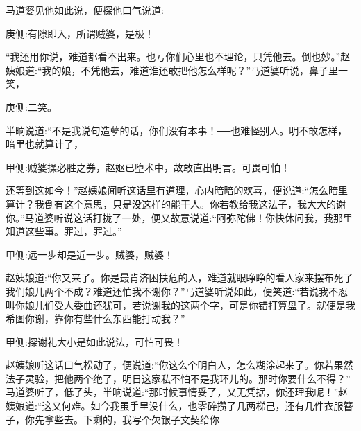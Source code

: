 \begin{parag}
    马道婆见他如此说，便探他口气说道:\begin{note}庚侧:有隙即入，所谓贼婆，是极！\end{note}“我还用你说，难道都看不出来。也亏你们心里也不理论，只凭他去。倒也妙。”赵姨娘道:“我的娘，不凭他去，难道谁还敢把他怎么样呢？”马道婆听说，鼻子里一笑，\begin{note}庚侧:二笑。\end{note}半晌说道:“不是我说句造孽的话，你们没有本事！──也难怪别人。明不敢怎样，暗里也就算计了，\begin{note}甲侧:贼婆操必胜之券，赵妪已堕术中，故敢直出明言。可畏可怕！\end{note}还等到这如今！”赵姨娘闻听这话里有道理，心内暗暗的欢喜，便说道:“怎么暗里算计？我倒有这个意思，只是没这样的能干人。你若教给我这法子，我大大的谢你。”马道婆听说这话打拢了一处，便又故意说道:“阿弥陀佛！你快休问我，我那里知道这些事。罪过，罪过。”\begin{note}甲侧:远一步却是近一步。贼婆，贼婆！\end{note}赵姨娘道:“你又来了。你是最肯济困扶危的人，难道就眼睁睁的看人家来摆布死了我们娘儿两个不成？难道还怕我不谢你？”马道婆听说如此，便笑道:“若说我不忍叫你娘儿们受人委曲还犹可，若说谢我的这两个字，可是你错打算盘了。就便是我希图你谢，靠你有些什么东西能打动我？”\begin{note}甲侧:探谢礼大小是如此说法，可怕可畏！\end{note}赵姨娘听这话口气松动了，便说道:“你这么个明白人，怎么糊涂起来了。你若果然法子灵验，把他两个绝了，明日这家私不怕不是我环儿的。那时你要什么不得？” 马道婆听了，低了头，半晌说道:“那时候事情妥了，又无凭据，你还理我呢！”赵姨娘道:“这又何难。如今我虽手里没什么，也零碎攒了几两梯己，还有几件衣服簪子，你先拿些去。下剩的，我写个欠银子文契给你
\end{parag}
